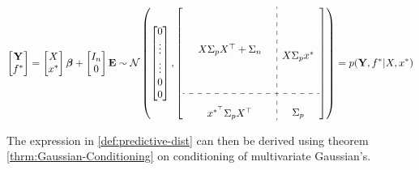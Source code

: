 \begin{gather}
    \begin{bmatrix}
        \mathbf{Y} \\
        f^{\ast}
    \end{bmatrix}
    = \begin{bmatrix} X \\ x^{\ast} \end{bmatrix} \boldsymbol{\beta} + \begin{bmatrix} I_n \\ 0 \end{bmatrix}  \mathbf{E}
    \sim \N \left(
        \begin{bmatrix}
        0 \\
        \vdots \\
        \vdots \\
        0 \\
        0
        \end{bmatrix},
        \left[
        \begin{array}{ c:c c c }
            \begin{matrix}
                & & \\
                & & \\
                & & \\
                & X \Sigma_p X^{\top} + \Sigma_n & \\
                & & \\
                & & \\
                & & \\
            \end{matrix}
            & \begin{matrix} \\ \\ \\ X \Sigma_p x^{\ast} \\ \\ \\ \end{matrix} \\
            \hdashline \\
            \begin{matrix} &  x^{\ast^{\top}}  \Sigma_p X^{\top} & \end{matrix} & \Sigma_p
        \end{array}
        \right]
        \right)
    = p(\mathbf{Y}, f^{\ast}| X, x^{\ast})
\end{gather}

The expression in \ref{def:predictive-dist} can then be derived using theorem \ref{thrm:Gaussian-Conditioning} on
conditioning of multivariate Gaussian's.

